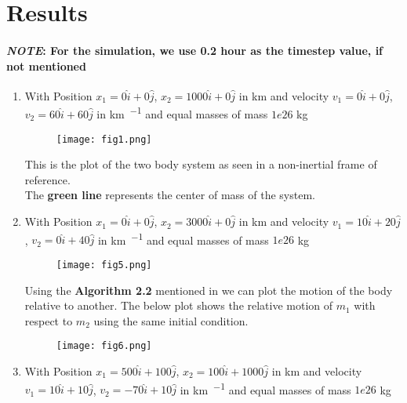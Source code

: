 \section{Results}

\paragraph{\textit{NOTE}: For the simulation, we use 0.2 hour as the timestep value, if not mentioned}

\begin{enumerate}

    \item
        With Position $x_1 = 0\hat{i} + 0\hat{j}$, $x_2 = 1000\hat{i} + 0\hat{j}$ in \si{\km} and velocity $v_1 = 0\hat{i} + 0\hat{j}$, $v_2 = 60\hat{i} + 60\hat{j}$ in \si{\km \per \sec} and equal masses of mass $1e26$ kg

        \begin{figure}[h!]
            \centering
            \texttt{[image: fig1.png]}
        \end{figure}

        This is the plot of the two body system as seen in a non-inertial frame of reference. \\The \textbf{green line} represents the center of mass of the system.

        \newpage
    \item

        With Position $x_1 = 0\hat{i} + 0\hat{j}$, $x_2 = 3000\hat{i} + 0\hat{j}$ in km and velocity $v_1 = 10\hat{i} + 20\hat{j}$, $v_2 = 0\hat{i} + 40\hat{j}$ in \si{\km \per \sec} and equal masses of mass $1e26$ kg

        \begin{figure}[h!]
            \centering
            \texttt{[image: fig5.png]}
        \end{figure}

        Using the \textbf{Algorithm 2.2} mentioned in \textcite{orbital_mechanics_4ed} we can plot the motion of the body relative to another. The below plot shows the relative motion of $m_1$ with respect to $m_2$ using the same initial condition.

        \begin{figure}[h!]
            \centering
            \texttt{[image: fig6.png]}
        \end{figure}

        \newpage
    \item
        With Position $x_1 = 500\hat{i} + 100\hat{j}$, $x_2 = 100\hat{i} + 1000\hat{j}$ in km and velocity $v_1 = 10\hat{i} + 10\hat{j}$, $v_2 = -70\hat{i} + 10\hat{j}$ in \si{\km \per \sec} and equal masses of mass $1e26$ kg


\end{enumerate}
